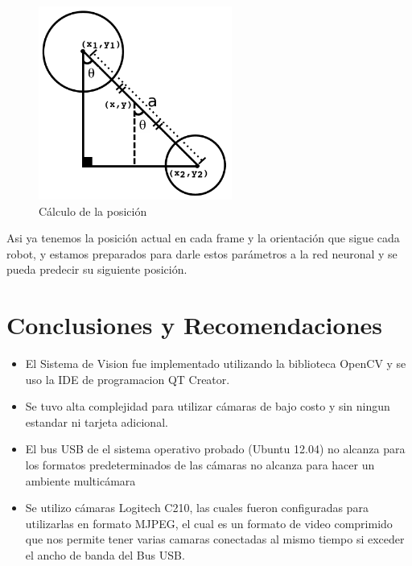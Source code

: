 \documentclass[conference]{IEEEtran}
\begin{document}
\begin{figure}
\centering
\includegraphics[width=2.5in]{imagen2.pdf}
\caption{C\'alculo de la posici\'on}
\label{fig_cir}
\end{figure}
Asi ya tenemos la posici\'on actual en cada frame y la orientaci\'on que sigue cada robot, y estamos preparados para darle estos par\'ametros a la red neuronal  y se pueda predecir su siguiente posici\'on.

%
\section{Conclusiones y Recomendaciones}
\begin{itemize}
\item El Sistema de Vision fue implementado utilizando la biblioteca OpenCV y se uso la IDE de programacion  QT Creator.
\item Se tuvo alta complejidad para utilizar c\'amaras de bajo costo y sin ningun estandar ni tarjeta adicional.
\item El bus USB de el sistema operativo probado (Ubuntu 12.04) no alcanza para los formatos predeterminados de las c\'amaras no alcanza para hacer un ambiente multic\'amara
\item Se utilizo c\'amaras Logitech C210, las cuales fueron configuradas para utilizarlas en formato MJPEG, el cual es un formato de video comprimido que nos permite tener varias camaras conectadas al mismo tiempo si exceder el ancho de banda del Bus USB.
\end{itemize}
\end{document}
